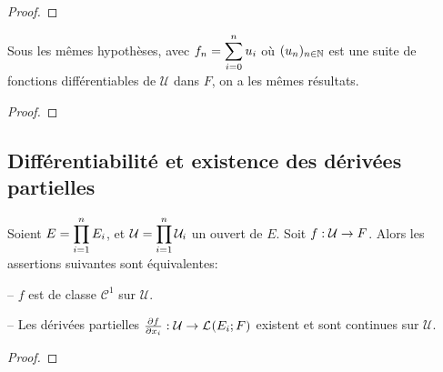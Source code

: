 \ifdefined\outputproof
\begin{proof}

\end{proof}
\fi

\begin{corollary}
	Sous les mêmes hypothèses, avec $f_{n} = \displaystyle \sum_{i = 0}^{n} u_{i}$ où
	$(u_{n})_{n \in \mathbb{N}}$ est une suite de fonctions différentiables de
	$\mathcal{U}$ dans $F$, on a les mêmes résultats.
\end{corollary}

\ifdefined\outputproof
\begin{proof}

\end{proof}
\fi


\subsection{Différentiabilité et existence des dérivées partielles}


\begin{theorem}
\label{theorem_partial_derivative_existence}

	Soient $E = \displaystyle \prod_{i = 1}^{n} E_{i}$, et $\mathcal{U} =
	\displaystyle \prod_{i = 1}^{n} \mathcal{U}_{i}$ un ouvert de $E$.
	Soit $f : \mathcal{U} \rightarrow F$.
	Alors les assertions suivantes sont équivalentes:

	-- $f$ est de classe $\mathcal{C}^{1}$ sur $\mathcal{U}$.

	-- Les dérivées partielles
	$\pdv{f}{x_{i}} : \mathcal{U} \rightarrow \mathcal{L}_{}(E_{i}; F)$
	existent et sont continues sur $\mathcal{U}$.
\end{theorem}

\ifdefined\outputproof
\begin{proof}

\end{proof}
\fi
